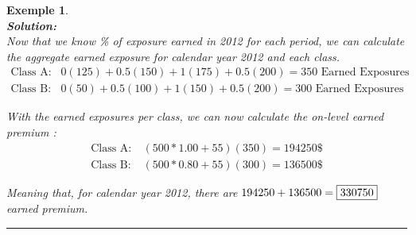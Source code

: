 \documentclass[11pt, english]{memoir}
\numberwithin{definition}{section}
\newtheorem{example}{Exemple}[section]
\newenvironment{exemple}
{
	\begin{example} \normalfont \ \\[5pt] 
	}
	{
		\hfill\rule{0.5em}{0.5em}\end{example}
}
\newenvironment{solution}
{\noindent\textbf{Solution:} \\[5pt] 
}{
}
\begin{document}
\begin{exemple}
\begin{solution}
		Now that we know \% of exposure earned in 2012 for each period, we can calculate the aggregate earned exposure for calendar year 2012 and each class.
		\begin{align*}
		\text{Class A}: \ & 0(125) + 0.5(150) + 1(175) + 0.5(200) = 350 \text{ Earned Exposures} \\
		\text{Class B}: \ & 0(50) + 0.5(100) + 1(150) + 0.5(200) = 300 \text{ Earned Exposures}
		\end{align*}
		 
		 With the earned exposures per class, we can now calculate the on-level earned premium : 
		\begin{align*}
		\text{Class A}: \ & (500*1.00 + 55)(350) = 194250\$ \\
		\text{Class B}: \ & (500*0.80 + 55)(300) = 136500\$
		\end{align*}
		
		Meaning that, for calendar year 2012, there are $ 194250 + 136500 = \fbox{330750} $ earned premium.
		\end{solution}
	\end{exemple}
	
\end{document}
